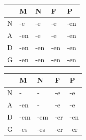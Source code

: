 \begin{tabular}{|M{2em}|M{2em}|M{2em}|M{2em}|M{2em}|}
    \hline
      & M   & N   & F   & P   \\
    \hline
    N & -e  & -e  & -e  & -en \\
    \hline
    A & -en & -e  & -e  & -en \\
    \hline
    D & -en & -en & -en & -en \\
    \hline
    G & -en & -en & -en & -en \\
    \hline
\end{tabular}
\begin{tabular}{|M{2em}|M{2em}|M{2em}|M{2em}|M{2em}|}
    \hline
      & M   & N   & F   & P   \\
    \hline
    N & -   & -   & -e  & -e  \\
    \hline
    A & -en & -   & -e  & -e  \\
    \hline
    D & -em & -em & -er & -en \\
    \hline
    G & -es & -es & -er & -er \\
    \hline
\end{tabular}